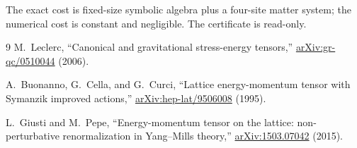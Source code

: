 The exact cost is fixed-size symbolic algebra plus a four-site matter system;
the numerical cost is constant and negligible.  The certificate is read-only.

\begingroup
\renewcommand{\refname}{References for the matter-coupling proof}
\begin{thebibliography}{9}
M.~Leclerc, ``Canonical and gravitational stress-energy tensors,''
\href{https://arxiv.org/abs/gr-qc/0510044}{arXiv:gr-qc/0510044} (2006).

A.~Buonanno, G.~Cella, and G.~Curci, ``Lattice energy-momentum tensor with
Symanzik improved actions,''
\href{https://arxiv.org/abs/hep-lat/9506008}{arXiv:hep-lat/9506008} (1995).

L.~Giusti and M.~Pepe, ``Energy-momentum tensor on the lattice:
non-perturbative renormalization in Yang--Mills theory,''
\href{https://arxiv.org/abs/1503.07042}{arXiv:1503.07042} (2015).
\end{thebibliography}
\endgroup
\endgroup
